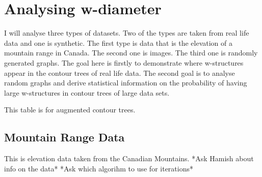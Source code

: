 \section{Analysing w-diameter}

I will analyse three types of datasets. Two of the types are taken from real life data and one is synthetic. The first type is data that is the elevation of a mountain range in Canada. The second one is images. The third one is randomly generated graphs. The goal here is firstly to demonstrate where w-structures appear in the contour trees of real life data. The second goal is to analyse random graphs and derive statistical information on the probability of having large w-structures in contour trees of large data sets.


This table is for augmented contour trees.

\subsection{Mountain Range Data}

This is elevation data taken from the Canadian Mountains. *Ask Hamish about info on the data* *Ask which algorihm to use for iterations*






